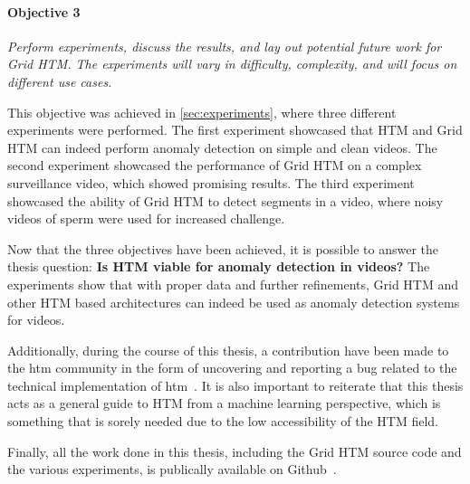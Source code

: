 \paragraph*{Objective 3} \emph{Perform experiments, discuss the results, and lay out potential future work for Grid HTM. The experiments will vary in difficulty, complexity, and will focus on different use cases.}
\par
This objective was achieved in \autoref{sec:experiments}, where three different experiments were performed. The first experiment showcased that HTM and Grid HTM can indeed perform anomaly detection on simple and clean videos. The second experiment showcased the performance of Grid HTM on a complex surveillance video, which showed promising results. The third experiment showcased the ability of Grid HTM to detect segments in a video, where noisy videos of sperm were used for increased challenge.
\par
Now that the three objectives have been achieved, it is possible to answer the thesis question: \textbf{Is HTM viable for anomaly detection in videos?} The experiments show that with proper data and further refinements, Grid HTM and other HTM based architectures can indeed be used as anomaly detection systems for videos.
\par
Additionally, during the course of this thesis, a contribution have been made to the  \gls*{htm} community in the form of uncovering and reporting a bug related to the technical implementation of  \gls*{htm}~\cite{github_contrib}. It is also important to reiterate that this thesis acts as a general guide to HTM from a machine learning perspective, which is something that is sorely needed due to the low accessibility of the HTM field.
\par
Finally, all the work done in this thesis, including the Grid HTM source code and the various experiments, is publically available on Github~\cite{master_thesis_github}.
